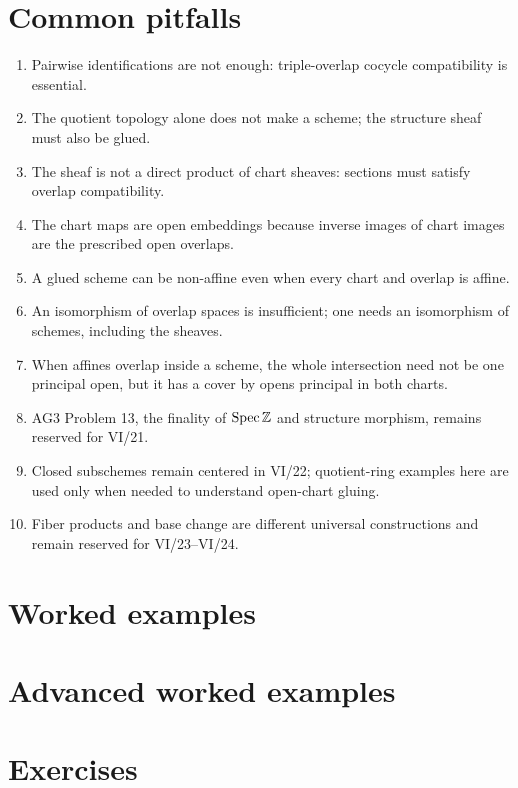 \section{Common pitfalls}
\begin{enumerate}
\item Pairwise identifications are not enough: triple-overlap cocycle compatibility is essential.
\item The quotient topology alone does not make a scheme; the structure sheaf must also be glued.
\item The sheaf is not a direct product of chart sheaves: sections must satisfy overlap compatibility.
\item The chart maps are open embeddings because inverse images of chart images are the prescribed open overlaps.
\item A glued scheme can be non-affine even when every chart and overlap is affine.
\item An isomorphism of overlap spaces is insufficient; one needs an isomorphism of schemes, including the sheaves.
\item When affines overlap inside a scheme, the whole intersection need not be one principal open, but it has a cover by opens principal in both charts.
\item AG3 Problem 13, the finality of $\operatorname{Spec}\mathbb Z$ and structure morphism, remains reserved for VI/21.
\item Closed subschemes remain centered in VI/22; quotient-ring examples here are used only when needed to understand open-chart gluing.
\item Fiber products and base change are different universal constructions and remain reserved for VI/23--VI/24.
\end{enumerate}

\section{Worked examples}


\section{Advanced worked examples}


\section{Exercises}

\ifdefined\IncludeExerciseHints

\fi

